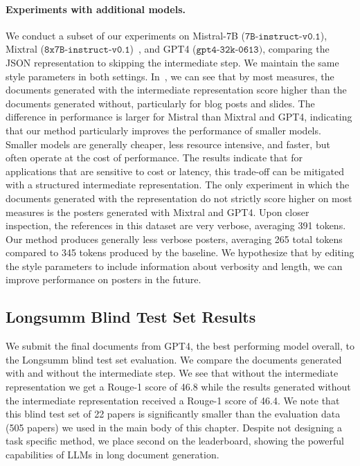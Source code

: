 \paragraph{Experiments with additional models.} We conduct a subset of our experiments on Mistral-7B ($\texttt{7B-instruct-v0.1}$), Mixtral ($\texttt{8x7B-instruct-v0.1
}$)~\cite{jiang2023mistral7b,Jiang2024MixtralOE}, and GPT4 ($\texttt{gpt4-32k-0613})$, comparing the JSON representation to skipping the intermediate step.  We maintain the same style parameters in both settings. In~, we can see that by most measures, the documents generated with the intermediate representation score higher than the documents generated without, particularly for blog posts and slides. The difference in performance is larger for Mistral than Mixtral and GPT4, indicating that our method particularly improves the performance of smaller models. Smaller models are generally cheaper, less resource intensive, and faster, but often operate at the cost of performance. The results indicate that for applications that are sensitive to cost or latency, this trade-off can be mitigated with a structured intermediate representation. The only experiment in which the documents generated with the representation do not strictly score higher on most measures is the posters generated with Mixtral and GPT4. Upon closer inspection, the references in this dataset are very verbose, averaging 391 tokens. Our method produces generally less verbose posters, averaging 265 total tokens compared to 345 tokens produced by the baseline. We hypothesize that by editing the style parameters to include information about verbosity and length, we can improve performance on posters in the future.


\subsection{Longsumm Blind Test Set Results}\label{sec:longsumm-blind}
We submit the final documents from GPT4, the best performing model overall, to the Longsumm blind test set evaluation. We compare the documents generated with and without the intermediate step. We see that without the intermediate representation we get a Rouge-1 score of 46.8 while the results generated without the intermediate representation received a Rouge-1 score of 46.4. We note that this blind test set of 22 papers is significantly smaller than the evaluation data (505 papers) we used in the main body of this chapter. Despite not designing a task specific method, we place second on the leaderboard, showing the powerful capabilities of LLMs in long document generation.

